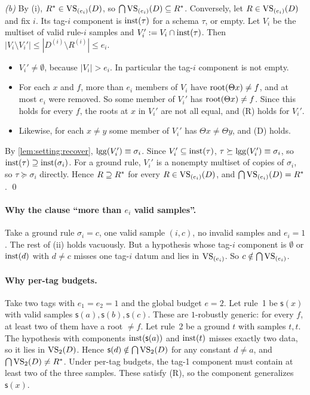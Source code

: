 \emph{(b)} By (i), $R^{*}\in\mathrm{VS}_{(e_i)}(D)$, so $\bigcap\mathrm{VS}_{(e_i)}(D)\subseteq R^{*}$. Conversely, let $R\in\mathrm{VS}_{(e_i)}(D)$ and fix $i$. Its tag-$i$ component is $\mathrm{inst}(\tau)$ for a schema $\tau$, or empty. Let $V_i$ be the multiset of valid rule-$i$ samples and $V_i':=V_i\cap\mathrm{inst}(\tau)$. Then $|V_i\setminus V_i'|\le|D^{(i)}\setminus R^{(i)}|\le e_i$.
\begin{itemize}
\item $V_i'\neq\emptyset$, because $|V_i|>e_i$. In particular the tag-$i$ component is not empty.
\item For each $x$ and $f$, more than $e_i$ members of $V_i$ have $\mathrm{root}(\Theta x)\neq f$, and at most $e_i$ were removed. So some member of $V_i'$ has $\mathrm{root}(\Theta x)\neq f$. Since this holds for every $f$, the roots at $x$ in $V_i'$ are not all equal, and (R) holds for $V_i'$.
\item Likewise, for each $x\neq y$ some member of $V_i'$ has $\Theta x\neq\Theta y$, and (D) holds.
\end{itemize}
By \cref{lem:setting:recover}, $\mathrm{lgg}(V_i')\equiv\sigma_i$. Since $V_i'\subseteq\mathrm{inst}(\tau)$, $\tau\succeq\mathrm{lgg}(V_i')\equiv\sigma_i$, so $\mathrm{inst}(\tau)\supseteq\mathrm{inst}(\sigma_i)$. For a ground rule, $V_i'$ is a nonempty multiset of copies of $\sigma_i$, so $\tau\succeq\sigma_i$ directly. Hence $R\supseteq R^{*}$ for every $R\in\mathrm{VS}_{(e_i)}(D)$, and $\bigcap\mathrm{VS}_{(e_i)}(D)=R^{*}$. \qed

\paragraph{Why the clause ``more than $e_i$ valid samples''.} Take a ground rule $\sigma_i=c$, one valid sample $(i,c)$, no invalid samples and $e_i=1$. The rest of (ii) holds vacuously. But a hypothesis whose tag-$i$ component is $\emptyset$ or $\mathrm{inst}(d)$ with $d\neq c$ misses one tag-$i$ datum and lies in $\mathrm{VS}_{(e_i)}$. So $c\notin\bigcap\mathrm{VS}_{(e_i)}$.

\paragraph{Why per-tag budgets.} Take two tags with $e_1=e_2=1$ and the global budget $e=2$. Let rule~1 be $\mathsf s(x)$ with valid samples $\mathsf s(a),\mathsf s(b),\mathsf s(c)$. These are $1$-robustly generic: for every $f$, at least two of them have a root $\neq f$. Let rule~2 be a ground $t$ with samples $t,t$. The hypothesis with components $\mathrm{inst}(\mathsf s(a))$ and $\mathrm{inst}(t)$ misses exactly two data, so it lies in $\mathrm{VS}_2(D)$. Hence $\mathsf s(d)\notin\bigcap\mathrm{VS}_2(D)$ for any constant $d\neq a$, and $\bigcap\mathrm{VS}_2(D)\neq R^{*}$. Under per-tag budgets, the tag-1 component must contain at least two of the three samples. These satisfy (R), so the component generalizes $\mathsf s(x)$.

